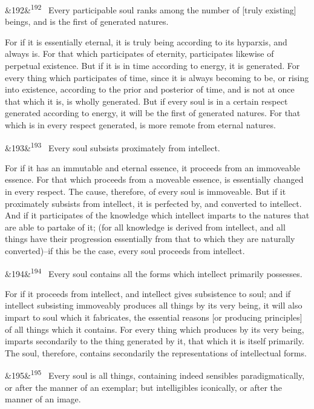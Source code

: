 \documentclass[12pt]{article}
\newcommand{\para}[1][]{\par\noindent\ifx&#1&\else\textsuperscript{\footnotesize #1}~\fi}
\begin{document}
\para[192] Every participable soul ranks among the number of [truly existing] beings, and is the first of generated natures.

For if it is essentially eternal, it is truly being according to its hyparxis, and always is. For that which participates of eternity, participates likewise of perpetual existence. But if it is in time according to energy, it is generated. For every thing which participates of time, since it is always becoming to be, or rising into existence, according to the prior and posterior of time, and is not at once that which it is, is wholly generated. But if every soul is in a certain respect generated according to energy, it will be the first of generated natures. For that which is in every respect generated, is more remote from eternal natures.

\para[193] Every soul subsists proximately from intellect.

For if it has an immutable and eternal essence, it proceeds from an immoveable essence. For that which proceeds from a moveable essence, is essentially changed in every respect. The cause, therefore, of every soul is immoveable. But if it proximately subsists from intellect, it is perfected by, and converted to intellect. And if it participates of the knowledge which intellect imparts to the natures that are able to partake of it; (for all knowledge is derived from intellect, and all things have their progression essentially from that to which they are naturally converted)--if this be the case, every soul proceeds from intellect.

\para[194] Every soul contains all the forms which intellect primarily possesses.

For if it proceeds from intellect, and intellect gives subsistence to soul; and if intellect subsisting immoveably produces all things by its very being, it will also impart to soul which it fabricates, the essential reasons [or producing principles] of all things which it contains. For every thing which produces by its very being, imparts secondarily to the thing generated by it, that which it is itself primarily. The soul, therefore, contains secondarily the representations of intellectual forms.

\para[195] Every soul is all things, containing indeed sensibles paradigmatically, or after the manner of an exemplar; but intelligibles iconically, or after the manner of an image.
\end{document}
